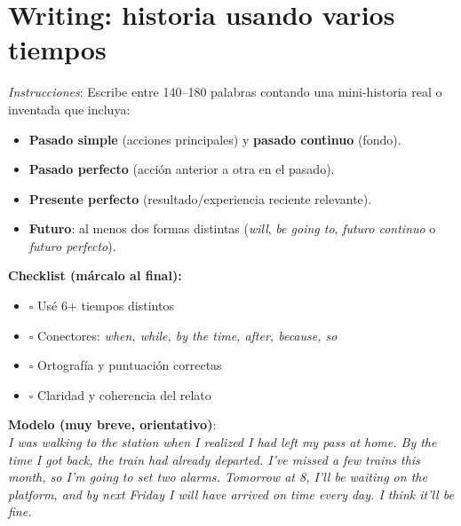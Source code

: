 \documentclass[11pt,a4paper]{article}
\begin{document}
\section{Writing: historia usando varios tiempos}
\textit{Instrucciones}: Escribe entre 140–180 palabras contando una mini-historia real o inventada que incluya:
\begin{itemize}
  \item \textbf{Pasado simple} (acciones principales) y \textbf{pasado continuo} (fondo).
  \item \textbf{Pasado perfecto} (acción anterior a otra en el pasado).
  \item \textbf{Presente perfecto} (resultado/experiencia reciente relevante).
  \item \textbf{Futuro}: al menos dos formas distintas (\emph{will}, \emph{be going to}, \emph{futuro continuo} o \emph{futuro perfecto}).
\end{itemize}
\textbf{Checklist (márcalo al final):}

\begin{itemize}
  \item $\square$ Usé 6+ tiempos distintos
  \item $\square$ Conectores: \emph{when, while, by the time, after, because, so}
  \item $\square$ Ortografía y puntuación correctas
  \item $\square$ Claridad y coherencia del relato
\end{itemize}
\vspace{0.6em}
\textbf{Modelo (muy breve, orientativo)}:\\
\textit{I was walking to the station when I realized I had left my pass at home. By the time I got back, the train had already departed. I’ve missed a few trains this month, so I’m going to set two alarms. Tomorrow at 8, I’ll be waiting on the platform, and by next Friday I will have arrived on time every day. I think it’ll be fine.}
\end{document}

